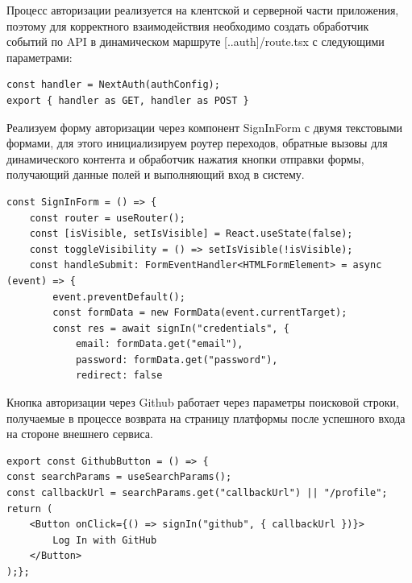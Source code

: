\documentclass[master, och, pract]{SCWorks}
\begin{document}
Процесс авторизации реализуется на клентской и серверной части приложения, поэтому для корректного взаимодействия необходимо создать обработчик событий по API в динамическом маршруте [..auth]/route.tsx с следующими параметрами:
\begin{verbatim}
const handler = NextAuth(authConfig);
export { handler as GET, handler as POST }
\end{verbatim}

Реализуем форму авторизации через компонент SignInForm с двумя текстовыми формами, для этого инициализируем роутер переходов, обратные вызовы для динамического контента и обработчик нажатия кнопки отправки формы, получающий данные полей и выполняющий вход в систему.
\begin{verbatim}
const SignInForm = () => {
    const router = useRouter();
    const [isVisible, setIsVisible] = React.useState(false);
    const toggleVisibility = () => setIsVisible(!isVisible);
    const handleSubmit: FormEventHandler<HTMLFormElement> = async (event) => {
        event.preventDefault();
        const formData = new FormData(event.currentTarget);
        const res = await signIn("credentials", {
            email: formData.get("email"),
            password: formData.get("password"),
            redirect: false
\end{verbatim}

Кнопка авторизации через Github работает через параметры поисковой строки, получаемые в процессе возврата на страницу платформы после успешного входа на стороне внешнего сервиса.
\begin{verbatim}
export const GithubButton = () => {
const searchParams = useSearchParams();
const callbackUrl = searchParams.get("callbackUrl") || "/profile";
return (
    <Button onClick={() => signIn("github", { callbackUrl })}>        
        Log In with GitHub
    </Button>
);};
\end{verbatim}
\end{document}
